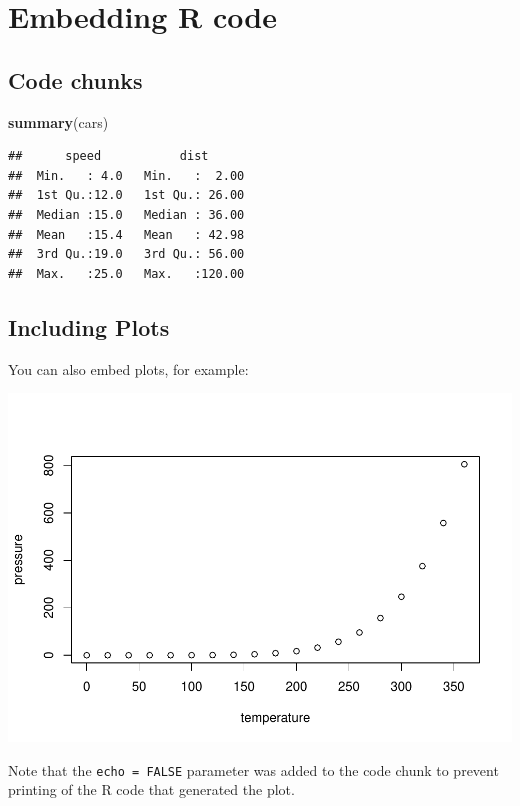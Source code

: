 \documentclass[]{interact}
\theoremstyle{plain}%
\theoremstyle{definition}
\theoremstyle{remark}
\newenvironment{Shaded}{\begin{snugshade}}{\end{snugshade}}
\newcommand{\KeywordTok}[1]{\textcolor[rgb]{0.13,0.29,0.53}{\textbf{#1}}}
\newcommand{\NormalTok}[1]{#1}
\begin{document}
\hypertarget{embedding-r-code}{%
\section{Embedding R code}\label{embedding-r-code}}

\hypertarget{code-chunks}{%
\subsection{Code chunks}\label{code-chunks}}

\begin{Shaded}
\begin{Highlighting}[]
\KeywordTok{summary}\NormalTok{(cars)}
\end{Highlighting}
\end{Shaded}

\begin{verbatim}
##      speed           dist       
##  Min.   : 4.0   Min.   :  2.00  
##  1st Qu.:12.0   1st Qu.: 26.00  
##  Median :15.0   Median : 36.00  
##  Mean   :15.4   Mean   : 42.98  
##  3rd Qu.:19.0   3rd Qu.: 56.00  
##  Max.   :25.0   Max.   :120.00
\end{verbatim}

\hypertarget{including-plots}{%
\subsection{Including Plots}\label{including-plots}}

You can also embed plots, for example:

\includegraphics[width=0.8\linewidth]{taylor-francis_files/figure-latex/pressure-1}

Note that the \texttt{echo\ =\ FALSE} parameter was added to the code chunk to prevent printing of the R code that generated the plot.
\end{document}
